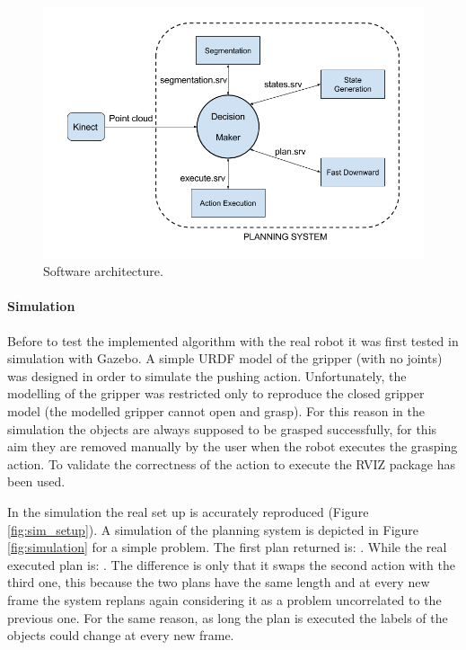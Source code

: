 \begin{figure}[h]
\centering
\includegraphics[width=14cm]{Img/software/Software_arquitecture.png}
\caption{Software architecture.}\label{fig:architecture}
\end{figure}


\paragraph{Simulation}
Before to test the implemented algorithm with the real robot it was first tested in simulation with Gazebo\citep{koenig2004design}. A simple URDF model of the gripper (with no joints) was designed in order to simulate the pushing action. Unfortunately, the modelling of the gripper was restricted only to reproduce the closed gripper model (the modelled gripper cannot open and grasp). For this reason in the simulation the objects are always supposed to be grasped successfully, for this aim they are removed manually by the user when the robot executes the grasping action. To validate the correctness of the action to execute the RVIZ package\citep{RVIZ} has been used.  

In the simulation the real set up is accurately reproduced (Figure \ref{fig:sim_setup}). A simulation of the planning system is depicted in Figure \ref{fig:simulation} for a simple problem.
The first plan returned is: . While the real executed plan is: . The difference is only that it swaps the second action with the third one, this because the two plans have the same length and at every new frame the system replans again considering it as a problem uncorrelated to the previous one. For the same reason, as long the plan is executed the labels of the objects could change at every new frame. %

